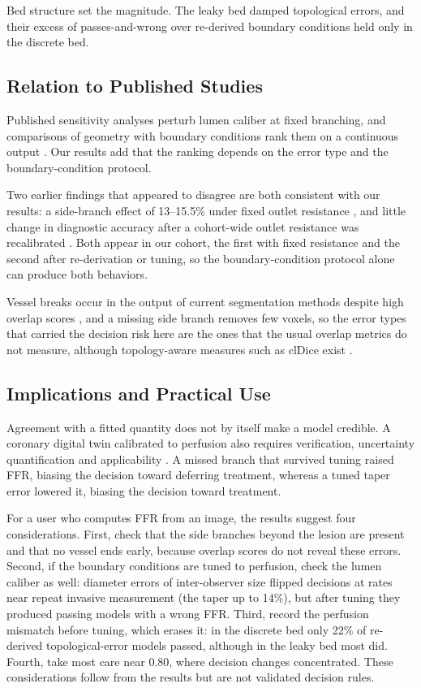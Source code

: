 \documentclass[journal,twoside,web]{ieeecolor}
\begin{document}
Bed structure set the magnitude. The leaky bed damped topological errors, and their excess of passes-and-wrong over
re-derived boundary conditions held only in the discrete bed.

\subsection{Relation to Published Studies}
Published sensitivity analyses perturb lumen caliber at fixed branching, and comparisons of geometry with boundary
conditions rank them on a continuous output \cite{sankaran2016,tanade2022,korte2023}. Our results add that the
ranking depends on the error type and the boundary-condition protocol.

Two earlier findings that appeared to disagree are both consistent with our results: a side-branch effect of 13--15.5\% under fixed
outlet resistance \cite{gamage2022}, and little change in diagnostic accuracy after a cohort-wide outlet resistance
was recalibrated \cite{gosling2020}. Both appear in our cohort, the first with fixed resistance and the second after re-derivation or tuning, so the boundary-condition protocol alone can
produce both behaviors.

Vessel breaks occur in the output of current segmentation methods despite high overlap scores \cite{bransby2026},
and a missing side branch removes few voxels, so the error types that carried the decision risk here are the ones that the usual overlap metrics do not measure, although topology-aware measures such as clDice
exist \cite{shit2021}.

\subsection{Implications and Practical Use}
Agreement with a fitted quantity does not by itself make a model credible. A coronary digital twin calibrated to perfusion also requires verification,
uncertainty quantification and applicability \cite{viceconti2025}. A missed branch that survived tuning raised FFR, biasing the decision toward
deferring treatment, whereas a tuned taper error lowered it, biasing the decision toward treatment.

For a user who computes FFR from an image, the results suggest four considerations. First, check that the side branches
beyond the lesion are present and that no vessel ends early, because overlap scores do not reveal these errors.
Second, if the boundary conditions are tuned to perfusion, check the lumen caliber as well: diameter errors of
inter-observer size flipped decisions at rates near repeat invasive measurement (the taper up to 14\%), but after
tuning they produced passing models with a wrong FFR. Third, record the perfusion mismatch before tuning, which erases it: in the discrete bed
only 22\% of re-derived topological-error models passed, although in the leaky bed most did. Fourth, take most care near 0.80,
where decision changes concentrated. These considerations follow from the results
but are not validated decision rules.
\end{document}
